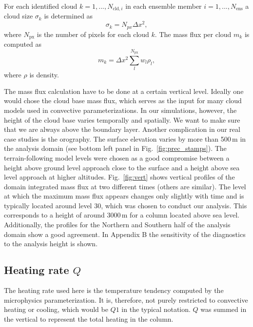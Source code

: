 \documentclass[a4paper, 12pt]{article}
\begin{document}
For each identified cloud $k=1,...,N_{\mathrm{cld},i}$ in each ensemble member $i=1,...,N_{\mathrm{ens}}$ a cloud size $\sigma_k$ is determined as
\begin{equation} \label{eq:cld_size}
 \sigma_k = N_{px} \Delta x^2,
\end{equation}
where $N_{\mathrm{px}}$ is the number of pixels for each cloud $k$. The mass flux per cloud $m_k$ is computed as
\begin{equation} \label{eq:mass_flux_per_cloud}
 m_k = \Delta x^2 \sum_{l}^{N_{\mathrm{px}}} w_l \rho_l,
\end{equation}
where $\rho$ is density.

The mass flux calculation have to be done at a certain vertical level. Ideally one would chose the cloud base mass flux, which serves as the input for many cloud models used in convective parameterizations. In our simulations, however, the height of the cloud base varies temporally and spatially. We want to make sure that we are always above the boundary layer. Another complication in our real case studies is the orography. The surface elevation varies by more than 500\,m in the analysis domain (see bottom left panel in Fig.~\ref{fig:prec_stamps}). The terrain-following model levels were chosen as a good compromise between a height above ground level approach close to the surface and a height above sea level approach at higher altitudes. Fig.~\ref{fig:vert} shows vertical profiles of the domain integrated mass flux at two different times (others are similar). The level at which the maximum mass flux appears changes only slightly with time and is typically located around level 30, which was chosen to conduct our analysis. This corresponds to a height of around 3000\,m for a column located above sea level. Additionally, the profiles for the Northern and Southern half of the analysis domain show a good agreement. In Appendix B the sensitivity of the diagnostics to the analysis height is shown.

\subsection{Heating rate $Q$}
The heating rate used here is the temperature tendency computed by the microphysics parameterization. It is, therefore, not purely restricted to convective heating or cooling, which would be $Q1$ in the typical notation. $Q$ was summed in the vertical to represent the total heating in the column.
\end{document}

